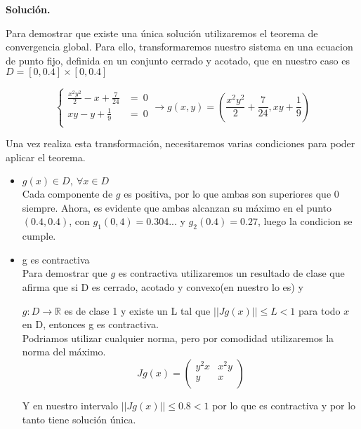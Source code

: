 \documentclass[11pt]{article}
\begin{document}
\textbf{Solución.}

Para demostrar que existe una única solución utilizaremos el teorema de
convergencia global. Para ello, transformaremos nuestro sistema en una ecuacion
de punto fijo, definida en un conjunto cerrado y acotado, que en nuestro caso
es $D = [0,0.4]\times[0,0.4]$

$$\begin{cases}
\frac{x^2y^2}{2} - x + \frac{7}{24} &= \ 0 \\
xy - y + \frac{1}{9} &= \ 0\\
\end{cases} \longrightarrow g(x,y) = (\frac{x^2y^2}{2} + \frac{7}{24}, xy +
\frac{1}{9} )$$

Una vez realiza esta transformación, necesitaremos varias condiciones para poder
aplicar el teorema.
\begin{itemize}
        \item $g(x) \in D ,\  \forall x \in D$\\
        Cada componente de $g$ es positiva, por lo que ambas son superiores que
        $0$ siempre. Ahora, es evidente que ambas alcanzan su máximo en el punto
        $(0.4, 0.4)$, con $g_1(0,4) = 0.304...$ y $g_2(0.4) = 0.27$, luego la condicion
        se cumple.
        \item g es contractiva\\
        Para demostrar que $g$ es contractiva utilizaremos un resultado de clase
        que afirma que si D es cerrado, acotado y convexo(en nuestro lo es) y

        $g:D \rightarrow \mathds{R}$ es de clase 1 y existe un L tal que
        $||Jg(x)|| \leq L < 1$ para todo $x$ en D, entonces g es contractiva.\\

        Podriamos utilizar cualquier norma, pero por comodidad utilizaremos la
        norma del máximo.
        $$Jg(x) =\begin{pmatrix}
 y^2x & x^2y    \\
 y    & x       \\
\end{pmatrix}        $$

Y en nuestro intervalo $||Jg(x)|| \leq 0.8 <1$ por lo que es contractiva y por lo tanto tiene solución única.
\end{itemize}
\end{document}
